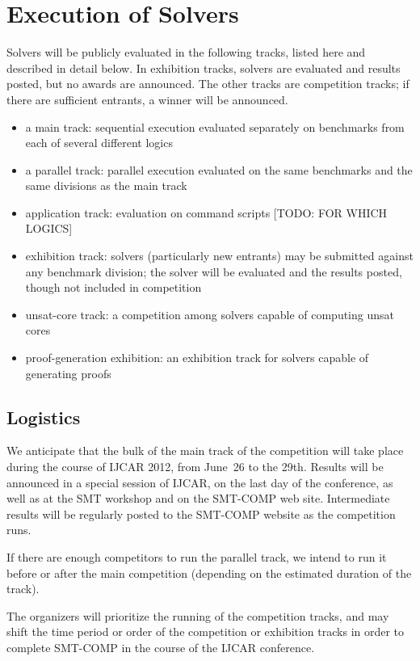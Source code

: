 \documentclass[12pt]{article}
\begin{document}
\section{Execution of Solvers}
\label{sec:exec}

Solvers will be publicly evaluated in the following tracks, listed here and 
described in detail below. In exhibition tracks, solvers are evaluated and results posted, but no awards are announced. The other tracks are competition tracks; if there are sufficient entrants, a winner will be announced.
\begin{itemize}
\item a main track: sequential execution evaluated separately on benchmarks from each of several different logics
\item a parallel track: parallel execution evaluated on the same benchmarks and the same divisions as the main track
\item application track: evaluation on command scripts [TODO: FOR WHICH LOGICS]
\item exhibition track: solvers (particularly new entrants) may be submitted against any benchmark division; the solver will be evaluated and the results posted, though not included in competition
\item unsat-core track: a competition among solvers capable of computing unsat cores
\item proof-generation exhibition: an exhibition track for solvers capable of generating proofs
\end{itemize}

\subsection{Logistics}

%
We anticipate that the bulk of the main track of the competition will take place during
the course of IJCAR 2012, from June~26 to the 29th.  Results will be
announced in a special session of IJCAR, on the last day of the
conference, as well as at the SMT workshop and on the SMT-COMP web site.  Intermediate results
will be regularly posted to the SMT-COMP website as the competition
runs.

If there are enough competitors to run the parallel track, we intend
to run it before or after the main competition (depending on the
estimated duration of the track).

The organizers will prioritize the running of the competition tracks, and may shift the
time period or order of the competition or exhibition tracks in order to complete SMT-COMP
in the course of the IJCAR conference.
\end{document}
